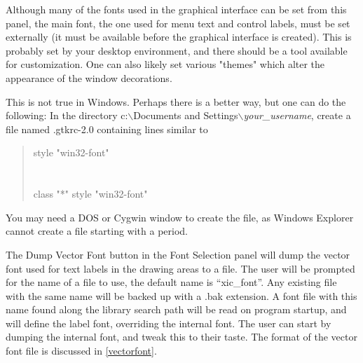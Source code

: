 Although many of the fonts used in the graphical interface can be set
from this panel, the main font, the one used for menu text and control
labels, must be set externally (it must be available before the
graphical interface is created).  This is probably set by your desktop
environment, and there should be a tool available for customization. 
One can also likely set various "themes" which alter the appearance of
the window decorations.

This is not true in Windows.  Perhaps there is a better way, but one
can do the following:  In the directory {\vt c:}$\backslash${\vt Documents
and Settings}$\backslash${\it your\_username}, create a file named {\vt
.gtkrc-2.0} containing lines similar to

\begin{quote}
{\vt style "win32-font"} \textbraceleft\\
\hspace*{2em}{\vt font\_name = "tahoma 12"}\\
\textbraceright\\
{\vt class "*" style "win32-font"}
\end{quote}

You may need a DOS or Cygwin window to create the file, as
Windows Explorer cannot create a file starting with a period.

The {\cb Dump Vector Font} button in the {\cb Font Selection} panel
will dump the vector font used for text labels in the drawing areas to
a file.  The user will be prompted for the name of a file to use, the
default name is ``{\vt xic\_font}''.  Any existing file with the same
name will be backed up with a {\vt .bak} extension.  A font file with
this name found along the library search path will be read on program
startup, and will define the label font, overriding the internal font. 
The user can start by dumping the internal font, and tweak this to
their taste.  The format of the vector font file is discussed in
\ref{vectorfont}.

